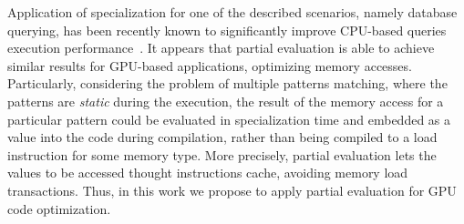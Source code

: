 \documentclass[sigplan]{acmart}\settopmatter{printacmref=false, printfolios=false}
\begin{document}


Application of specialization for one of the described scenarios, namely database querying, has been recently known to significantly improve CPU-based queries execution performance~\cite{10.1007/978-3-319-74313-4_27}.
It appears that partial evaluation is able to achieve similar results for GPU-based applications, optimizing memory accesses.
Particularly, considering the problem of multiple patterns matching, where the patterns are \emph{static} during the execution, the result of the memory access for a particular pattern could be evaluated in specialization time and embedded as a value into the code during compilation, rather than being compiled to a load instruction for some memory type.
More precisely, partial evaluation lets the values to be accessed thought instructions cache, avoiding memory load transactions.
Thus, in this work we propose to apply partial evaluation for GPU code optimization.

\end{document}
